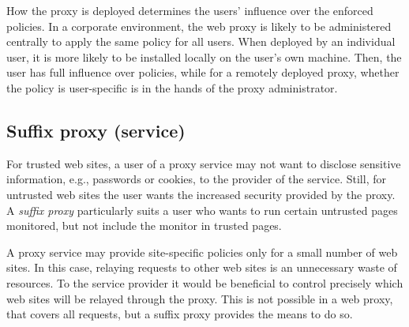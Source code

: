 \documentclass{llncs}
\newcommand{\todo}[1]{\colorbox{red}{\textcolor{white}{\sffamily\bfseries\scriptsize TODO}} \textcolor{red}{#1} \textcolor{red}{$\blacktriangleleft$}}
\begin{document}
How the proxy is 
deployed determines the users' influence over 
the enforced policies.
In a corporate environment, the web proxy is likely to be 
administered centrally to apply the same policy for all users. When deployed by 
an individual user, it is more likely to be installed locally on the user's own machine.
Then, the user has full influence over 
policies, while for a remotely deployed proxy,
whether the policy is user-specific is 
in the hands of the proxy administrator. 





\subsection{Suffix proxy (service)}
\label{sec:arch-suffix}


For trusted web sites, a user of a proxy service may not want to disclose
sensitive information, e.g., passwords or cookies, to the provider of the service.
Still, for untrusted web sites the user wants the increased security provided 
by the proxy.
A \emph{suffix proxy} particularly suits a user who wants to run certain untrusted 
pages monitored, but not include the monitor in trusted pages.

A proxy service may provide site-specific policies only for a small number 
of web sites. In this case, relaying requests to other web sites is an 
unnecessary waste of resources. To the service provider it would be beneficial to 
control precisely which web sites will be relayed through the proxy. 
This is not possible in a web proxy, that covers all requests, but a suffix proxy 
provides the means to do so.
\end{document}

